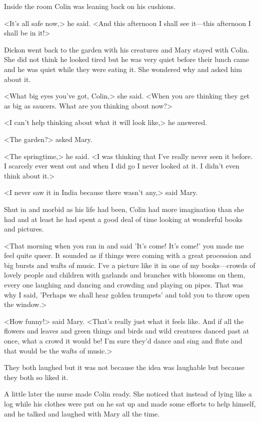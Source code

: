Inside the room Colin was leaning back on his cushions.

<It's all safe now,> he said. <And this afternoon I shall see it—this afternoon I shall be in it!>

Dickon went back to the garden with his creatures and Mary stayed with Colin. She did not think he looked tired but he was very quiet before their lunch came and he was quiet while they were eating it. She wondered why and asked him about it.

<What big eyes you've got, Colin,> she said. <When you are thinking they get as big as saucers. What are you thinking about now?>

<I can't help thinking about what it will look like,> he answered.

<The garden?> asked Mary.

<The springtime,> he said. <I was thinking that I've really never seen it before. I scarcely ever went out and when I did go I never looked at it. I didn't even think about it.>

<I never saw it in India because there wasn't any,> said Mary.

Shut in and morbid as his life had been, Colin had more imagination than she had and at least he had spent a good deal of time looking at wonderful books and pictures.

<That morning when you ran in and said 'It's come! It's come!' you made me feel quite queer. It sounded as if things were coming with a great procession and big bursts and wafts of music. I've a picture like it in one of my books—crowds of lovely people and children with garlands and branches with blossoms on them, every one laughing and dancing and crowding and playing on pipes. That was why I said, 'Perhaps we shall hear golden trumpets' and told you to throw open the window.>

<How funny!> said Mary. <That's really just what it feels like. And if all the flowers and leaves and green things and birds and wild creatures danced past at once, what a crowd it would be! I'm sure they'd dance and sing and flute and that would be the wafts of music.>

They both laughed but it was not because the idea was laughable but because they both so liked it.

A little later the nurse made Colin ready. She noticed that instead of lying like a log while his clothes were put on he sat up and made some efforts to help himself, and he talked and laughed with Mary all the time.

